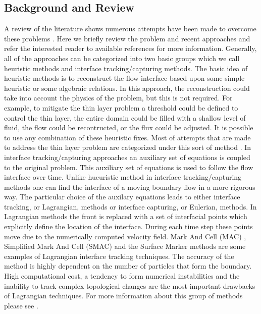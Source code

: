 \documentclass[letterpaper,10pt]{article}
\begin{document}
\subsection{Background and Review}
A review of the literature shows numerous attempts have been made to overcome these problems \cite{Medeiros2013,Balzano1998,Aureli2008,Bunya2009,Casulli2009a,
Kesserwani2011,DAlpaos2007,Castro2005}.
Here we briefly review the problem and recent approaches and refer the interested reader to available references for more information.
Generally, all of the approaches can be 
categorized into two basic groups which we call heuristic methods and interface tracking/capturing methods.
The basic idea of heuristic methods is to reconstruct the flow interface based upon 
some simple heuristic or some algebraic relations. In this approach, the reconstruction could take into account the physics of the problem, but this is not required. 
For example, to mitigate the thin layer problem a threshold could be defined to control the thin layer, the entire domain could be filled with a shallow level of fluid,
the flow could be recontructed, or the flux could be adjusted. It is possible to use any combination of these heuristic fixes.
Most of attempts that are made to address the thin layer problem are categorized under this sort of method \cite{Aureli2008,Bunya2009,Castro2005,Kesserwani2011}.
In interface tracking/capturing approaches
an auxiliary set of equations is coupled to the original problem. This auxiliary set of equations is used to follow the flow interface over time. 
Unlike hueuristic method in interface tracking/capturing methods one can find the interface of a moving boundary flow in a more rigorous way. 
The particular choice of the auxilary equations leads to either interface tracking, or Lagrangian, methods or interface capturing, or Eulerian, methods.
In Lagrangian methods the front is replaced with a set of interfacial points which explicitly define the location of the interface.
During each time step these points move due to the numerically computed velocity field.
Mark And Cell (MAC) \cite{Harlow1965}, Simplified Mark And Cell (SMAC) \cite{Cheng1995} and the Surface Marker \citep{Wrobel1991} methods are some examples of Lagrangian interface tracking techniques.
The accuracy of the method is highly dependent on the number of particles that form the boundary.
High computational cost, a tendency to form numerical instabilities and the inability to track complex topological changes are the most important drawbacks of Lagrangian techniques.
For more information about this group of methods please see \cite{Glimm1995,Unverdi1992,Osher1988,Anderson1998,hirt1981vfv}.
\end{document}
